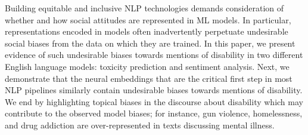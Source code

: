 Building equitable and inclusive NLP technologies demands consideration of whether and how social attitudes are represented in ML models. In particular, representations encoded in models often inadvertently perpetuate undesirable social biases from the data on which they are trained. In this paper, we present evidence of such undesirable biases towards mentions of disability in two different English language models: toxicity prediction and sentiment analysis. Next, we demonstrate that the neural embeddings that are the critical first step in most NLP pipelines similarly contain undesirable biases towards mentions of disability. We end by highlighting topical biases in the discourse about disability which may contribute to the observed model biases; for instance, gun violence, homelessness, and drug addiction are over-represented in texts discussing mental illness.
